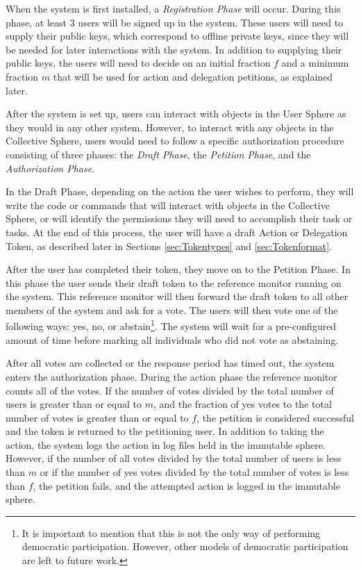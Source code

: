 When the system is first installed, a \textit{Registration Phase} will occur.
During this phase, at least 3 users will be signed up in the system. These users
will need to supply their public keys, which correspond to offline private keys,
since they will be needed for later interactions with the system. In addition to
supplying their public keys, the users will need to decide on an initial
fraction $f$ and a minimum fraction $m$ that will be used for action and
delegation petitions, as explained later.

After the system is set up, users can interact with objects in the User Sphere
as they would in any other system. However, to interact with any objects in the
Collective Sphere, users would need to follow a specific authorization
procedure consisting of three phases: the \textit{Draft Phase}, the 
\textit{Petition Phase}, and the \textit{Authorization Phase}.

In the Draft Phase, depending on the action the user wishes to perform, they
will write the code or commands that will interact with objects in the
Collective Sphere, or will identify the permissions they will need to accomplish
their task or tasks. At the end of this process, the user will have a draft
Action or Delegation Token, as described later in Sections \ref{sec:Tokentypes}
and \ref{sec:Tokenformat}.

After the user has completed their token, they move on to the Petition Phase. In
this phase the user sends their draft token to the reference monitor running on
the system. This reference monitor will then forward the draft token to all
other members of the system and ask for a vote. The users will then vote one of
the following ways: yes, no, or abstain\footnote{It is important to mention that
this is not the only way of performing democratic participation. However, other
models of democratic participation are left to future work.}. The system will
wait for a pre-configured amount of time before marking all individuals who did not
vote as abstaining.

After all votes are collected or the response period has timed out, the system
enters the authorization phase. During the action phase the reference monitor
counts all of the votes. If the number of votes divided by the total number of
users is greater than or equal to $m$, and the fraction of yes votes to the
total number of votes is greater than or equal to $f$, the petition is
considered successful and the token is returned to the petitioning user. In
addition to taking the action, the system logs the action in log files held in
the immutable sphere. However, if the number of all votes divided by the total
number of users is less than $m$ or if the number of yes votes divided by the
total number of votes is less than $f$, the petition fails, and the attempted
action is logged in the immutable sphere.

